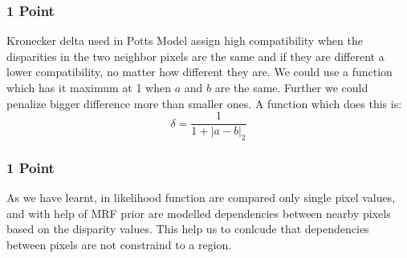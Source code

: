 \subsubsection{1 Point}
Kronecker delta used in Potts Model assign high compatibility when the disparities in the two neighbor pixels are the same and if they are different a lower compatibility, no matter how different they are.  
We could use a function which has it maximum at 1 when $a$ and $b$ are the same. Further we could penalize bigger difference more than smaller ones. A function which does this is:
$$ \delta = \frac{1}{1+|a-b|_2}$$

\subsubsection{1 Point}
As we have learnt, in likelihood function are compared only single pixel values, and with help of MRF prior are modelled dependencies between nearby pixels based  on the disparity values. This help us to conlcude that dependencies between pixels are not constraind to a region.